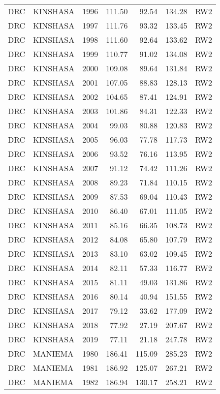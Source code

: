 \begin{longtable}{lllrrrl}
  DRC & KINSHASA & 1996 & 111.50 & 92.54 & 134.28 & RW2 \\ 
  DRC & KINSHASA & 1997 & 111.76 & 93.32 & 133.45 & RW2 \\ 
  DRC & KINSHASA & 1998 & 111.60 & 92.64 & 133.62 & RW2 \\ 
  DRC & KINSHASA & 1999 & 110.77 & 91.02 & 134.08 & RW2 \\ 
  DRC & KINSHASA & 2000 & 109.08 & 89.64 & 131.84 & RW2 \\ 
  DRC & KINSHASA & 2001 & 107.05 & 88.83 & 128.13 & RW2 \\ 
  DRC & KINSHASA & 2002 & 104.65 & 87.41 & 124.91 & RW2 \\ 
  DRC & KINSHASA & 2003 & 101.86 & 84.31 & 122.33 & RW2 \\ 
  DRC & KINSHASA & 2004 & 99.03 & 80.88 & 120.83 & RW2 \\ 
  DRC & KINSHASA & 2005 & 96.03 & 77.78 & 117.73 & RW2 \\ 
  DRC & KINSHASA & 2006 & 93.52 & 76.16 & 113.95 & RW2 \\ 
  DRC & KINSHASA & 2007 & 91.12 & 74.42 & 111.26 & RW2 \\ 
  DRC & KINSHASA & 2008 & 89.23 & 71.84 & 110.15 & RW2 \\ 
  DRC & KINSHASA & 2009 & 87.53 & 69.04 & 110.43 & RW2 \\ 
  DRC & KINSHASA & 2010 & 86.40 & 67.01 & 111.05 & RW2 \\ 
  DRC & KINSHASA & 2011 & 85.16 & 66.35 & 108.73 & RW2 \\ 
  DRC & KINSHASA & 2012 & 84.08 & 65.80 & 107.79 & RW2 \\ 
  DRC & KINSHASA & 2013 & 83.10 & 63.02 & 109.45 & RW2 \\ 
  DRC & KINSHASA & 2014 & 82.11 & 57.33 & 116.77 & RW2 \\ 
  DRC & KINSHASA & 2015 & 81.11 & 49.03 & 131.86 & RW2 \\ 
  DRC & KINSHASA & 2016 & 80.14 & 40.94 & 151.55 & RW2 \\ 
  DRC & KINSHASA & 2017 & 79.12 & 33.62 & 177.09 & RW2 \\ 
  DRC & KINSHASA & 2018 & 77.92 & 27.19 & 207.67 & RW2 \\ 
  DRC & KINSHASA & 2019 & 77.11 & 21.18 & 247.78 & RW2 \\ 
  DRC & MANIEMA & 1980 & 186.41 & 115.09 & 285.23 & RW2 \\ 
  DRC & MANIEMA & 1981 & 186.92 & 125.07 & 267.21 & RW2 \\ 
  DRC & MANIEMA & 1982 & 186.94 & 130.17 & 258.21 & RW2 \\ 

\end{longtable}
